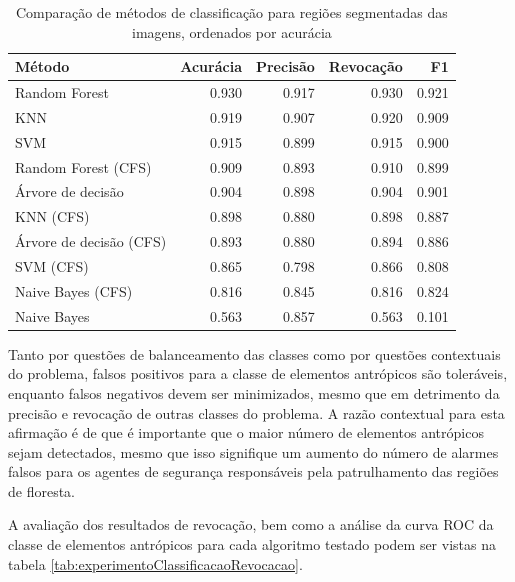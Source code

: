 \begin{table}[h]
\centering
	\begin{tabulary}{\linewidth}{|L|R|R|R|R|}
		\hline
		\textbf{Método} & \textbf{Acurácia} & \textbf{Precisão} & \textbf{Revocação} & \textbf{F1} \\ \hline
		Random Forest           & 0.930 & 0.917 & 0.930 & 0.921 \\ \hline
		KNN                     & 0.919 & 0.907 & 0.920 & 0.909 \\ \hline
		SVM                     & 0.915 & 0.899 & 0.915 & 0.900 \\ \hline
		Random Forest (CFS)     & 0.909 & 0.893 & 0.910 & 0.899 \\ \hline
		Árvore de decisão       & 0.904 & 0.898 & 0.904 & 0.901 \\ \hline
		KNN (CFS)               & 0.898 & 0.880 & 0.898 & 0.887 \\ \hline
		Árvore de decisão (CFS) & 0.893 & 0.880 & 0.894 & 0.886 \\ \hline
		SVM (CFS)               & 0.865 & 0.798 & 0.866 & 0.808 \\ \hline
		Naive Bayes (CFS)       & 0.816 & 0.845 & 0.816 & 0.824 \\ \hline
		Naive Bayes             & 0.563 & 0.857 & 0.563 & 0.101 \\ \hline
	\end{tabulary}
\caption{Comparação de métodos de classificação para regiões segmentadas das imagens, ordenados por acurácia}
\label{tab:experimentoClassificacao1}
\end{table}

Tanto por questões de balanceamento das classes como por questões contextuais do problema, falsos positivos para a classe de elementos antrópicos são toleráveis, enquanto falsos negativos devem ser minimizados, mesmo que em detrimento da precisão e revocação de outras classes do problema. A razão contextual para esta afirmação é de que é importante que o maior número de elementos antrópicos sejam detectados, mesmo que isso signifique um aumento do número de alarmes falsos para os agentes de segurança responsáveis pela patrulhamento das regiões de floresta.

A avaliação dos resultados de revocação, bem como a análise da curva ROC da classe de elementos antrópicos para cada algoritmo testado podem ser vistas na tabela \ref{tab:experimentoClassificacaoRevocacao}.

